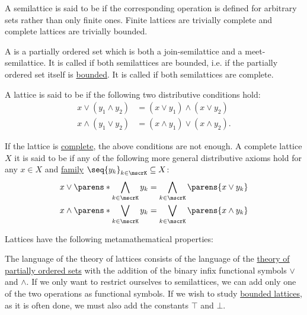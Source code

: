 \begin{definition}
\begin{thmenum}[series=def:semilattice]
     A semilattice is said to be  if the corresponding operation is defined for arbitrary sets rather than only finite ones. Finite lattices are trivially complete and complete lattices are trivially bounded.

     A  is a partially ordered set which is both a join-semilattice and a meet-semilattice. It is called  if both semilattices are bounded, i.e. if the partially ordered set itself is \hyperref[def:partially_ordered_set_extremal_points/top_and_bottom]{bounded}. It is called  if both semilattices are complete.

     A lattice is said to be  if the following two distributive conditions hold:
    \begin{align}
      x \vee (y_1 \wedge y_2) &= (x \vee y_1) \wedge (x \vee y_2) \label{eq:def:semilattice/distributive_lattice/finite/join_over_meet} \\
      x \wedge (y_1 \vee y_2) &= (x \wedge y_1) \vee (x \wedge y_2) \label{eq:def:semilattice/distributive_lattice/finite/meet_over_join}.
    \end{align}

    If the lattice is \hyperref[def:semilattice/complete]{complete}, the above conditions are not enough. A complete lattice \( X \) it is said to be  if any of the following more general distributive axioms hold for any \( x \in X \) and \hyperref[def:cartesian_product/indexed_family]{family} \( \seq{ y_k }_{k \in \mscrK} \subseteq X \):
    \begin{align}
      x \vee \parens*{ \bigwedge_{k \in \mscrK} y_k } &= \bigwedge_{k \in \mscrK} \parens{ x \vee y_k } \label{eq:def:semilattice/distributive_lattice/arbitrary/join_over_meet} \\
      x \wedge \parens*{ \bigvee_{k \in \mscrK} y_k } &= \bigvee_{k \in \mscrK} \parens{ x \wedge y_k } \label{eq:def:semilattice/distributive_lattice/arbitrary/meet_over_join}
    \end{align}
  \end{thmenum}

  Lattices have the following metamathematical properties:
  \begin{thmenum}[resume=def:semilattice]
     The language of the theory of lattices consists of the language of the \hyperref[def:partially_ordered_set/theory]{theory of partially ordered sets} with the addition of the binary infix functional symbols \( \vee \) and \( \wedge \). If we only want to restrict ourselves to semilattices, we can add only one of the two operations as functional symbols. If we wish to study \hyperref[def:semilattice/bounded]{bounded lattices}, as it is often done, we must also add the constants \( \top \) and \( \bot \).


\end{thmenum}
\end{definition}
